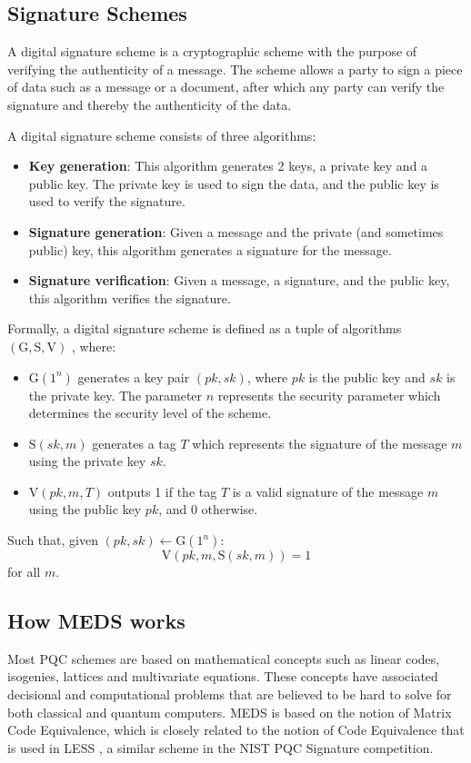 \documentclass[11pt,a4paper]{report}
\begin{document}
\subsection{Signature Schemes}
\label{sec:signatureschemes}
A digital signature scheme is a cryptographic scheme with the purpose of verifying the authenticity of a message. The scheme allows a party to sign a piece of data such as a message or a document, after which any party can verify the signature and thereby the authenticity of the data.

A digital signature scheme consists of three algorithms:
\begin{itemize}
  \item \textbf{Key generation}: This algorithm generates 2 keys, a private key and a public key. The private key is used to sign the data, and the public key is used to verify the signature.
  \item \textbf{Signature generation}: Given a message and the private (and sometimes public) key, this algorithm generates a signature for the message.
  \item \textbf{Signature verification}: Given a message, a signature, and the public key, this algorithm verifies the signature.
\end{itemize}

Formally, a digital signature scheme is defined as a tuple of algorithms $(\text{G}, \text{S}, \text{V})$ \cite{goldwasser2008lecture}, where:
\begin{itemize}
  \item $\text{G}(1^n)$ generates a key pair $(pk, sk)$, where $pk$ is the public key and $sk$ is the private key. The parameter $n$ represents the security parameter which determines the security level of the scheme.
  \item $\text{S}(sk, m)$ generates a tag $T$ which represents the signature of the message $m$ using the private key $sk$.
  \item $\text{V}(pk, m, T)$ outputs 1 if the tag $T$ is a valid signature of the message $m$ using the public key $pk$, and 0 otherwise.
\end{itemize}
Such that, given $(pk, sk) \leftarrow \text{G}(1^n)$:
\[
  \text{V}(pk, m, \text{S}(sk, m)) = 1
\]
for all $m$.

\subsection{How MEDS works}
\label{sec:medsworks}
Most PQC schemes are based on mathematical concepts such as linear codes, isogenies, lattices and multivariate equations. These concepts have associated decisional and computational problems that are believed to be hard to solve for both classical and quantum computers. MEDS is based on the notion of Matrix Code Equivalence, which is closely related to the notion of Code Equivalence that is used in LESS \cite{biasse2020less}, a similar scheme in the NIST PQC Signature competition.
\end{document}
